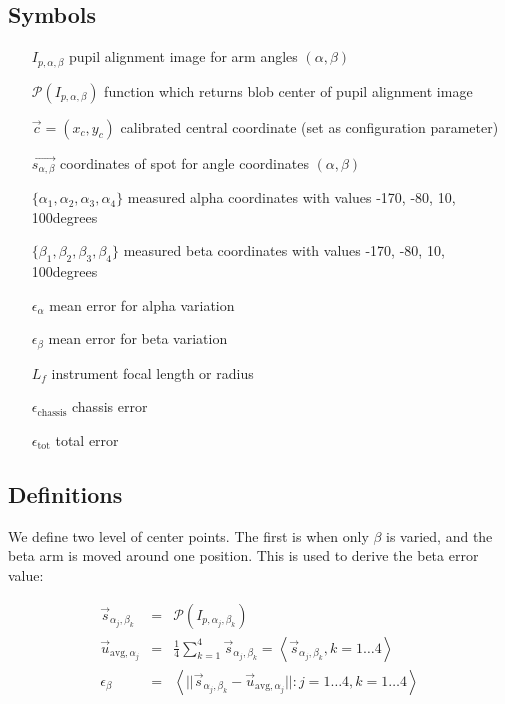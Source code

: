 \documentclass[11pt,a4paper,twoside]{scrartcl}
\begin{document}
\subsection{Symbols}
\begin{itemize}
  \item[$I_{p,\alpha,\beta}$] pupil alignment image for arm angles $(\alpha,\beta)$
\item[$\mathcal{P}(I_{p,\alpha,\beta})$] function which returns blob center of pupil alignment image
\item[$\vec{c} = (x_c, y_c)$] calibrated central coordinate (set as configuration parameter)
\item[$\vec{s_{\alpha,\beta}}$]  coordinates of spot for angle coordinates $(\alpha, \beta)$
\item[$\{ \alpha_1, \alpha_2, \alpha_3, \alpha_4\}$] measured alpha coordinates with values -170\degree, -80\degree, 10\degree, 100\degree degrees
\item[$\{ \beta_1, \beta_2, \beta_3, \beta_4\}$] measured beta coordinates  with values -170\degree, -80\degree, 10\degree, 100\degree degrees
\item[$\epsilon_\alpha$] mean error for alpha variation
\item[$\epsilon_\beta$] mean error for beta variation
\item[$L_f$] instrument focal length or radius
\item[$\epsilon_\mathrm{chassis}$] chassis error
\item[$\epsilon_\mathrm{tot}$] total error

\end{itemize}

\subsection{Definitions}
We define two level of center points. The first is when only $\beta$ is varied,
and the beta arm is moved around one position. This is used to derive
the beta error value:

\begin{eqnarray}
  \vec{s}_{\alpha_j,\beta_k} & =  & \mathcal{P}(I_{p,\alpha_j,\beta_k}) \\
  \vec{u}_{\mathrm{avg}, \alpha_j} & = & \frac{1}{4} \sum_{k=1}^{4} \vec{s}_{\alpha_j,\beta_k} = \left<\vec{s}_{\alpha_j,\beta_k}, k = 1 \ldots 4 \right>\\
  \epsilon_\beta & = & \left< ||\vec{s}_{\alpha_j,\beta_k} - \vec{u}_{\mathrm{avg}, \alpha_j} || : j = 1 \ldots 4, k = 1 \ldots 4 \right>
\end{eqnarray}
\end{document}
